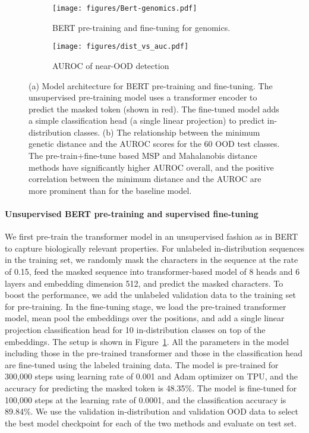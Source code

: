 \documentclass{article}
\begin{document}
\begin{figure}[ht]
	\centering
\begin{subfigure}[h]{0.52\textwidth}{ 	\texttt{[image: figures/Bert-genomics.pdf]}
          \caption{BERT pre-training and fine-tuning for genomics.}
         \label{fig:genomics:bert}
 }\end{subfigure}
 \begin{subfigure}[h]{0.42\textwidth}{ 
 \texttt{[image: figures/dist\_vs\_auc.pdf]}
           \caption{AUROC of near-OOD detection}
         \label{fig:genomics:auroc}
 }\end{subfigure}
 \vspace{-0.5em}
	\caption{(a) Model architecture for BERT pre-training and fine-tuning. The unsupervised pre-training model uses a transformer encoder to predict the masked token (shown in red). The fine-tuned model adds a simple classification head (a single linear projection) to predict in-distribution classes. (b) The relationship between the minimum genetic distance and the AUROC scores for the 60 OOD test classes. The pre-train+fine-tune based MSP and Mahalanobis distance methods have significantly higher AUROC overall, and the positive correlation between the minimum distance and the AUROC are more prominent than for the baseline model. }
\vspace{-1em}
	\label{fig:genomics}
\end{figure}

\paragraph{Unsupervised BERT pre-training and supervised fine-tuning}
We first pre-train the transformer model in an unsupervised fashion as in BERT to capture biologically relevant properties.
For unlabeled in-distribution sequences in the training set, we randomly mask the characters in the sequence at the rate of 0.15, feed the masked sequence into transformer-based model of 8 heads and 6 layers and embedding dimension 512, and predict the masked characters. 
To boost the performance, we add the unlabeled validation data to the training set for pre-training.
In the fine-tuning stage, we load the pre-trained transformer model, mean pool the embeddings over the positions, and add a single linear projection classification head for 10 in-distribution classes on top of the embeddings. The setup is shown in Figure~\ref{fig:genomics:bert}. 
All the parameters in the model including those in the pre-trained transformer and those in the classification head are fine-tuned using the labeled training data.
The model is pre-trained for 300,000 steps using learning rate of 0.001 and Adam optimizer \citep{kingma2014adam} on TPU,
and the accuracy for predicting the masked token is 48.35\%. 
The model is fine-tuned for 100,000 steps at the learning rate of 0.0001, and the classification accuracy is 89.84\%. 
We use the validation in-distribution and validation OOD data to select the best model checkpoint for each of the two methods and evaluate on test set. 
\end{document}
